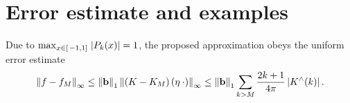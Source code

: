 \documentclass[11pt,a4paper,twoside,bibtotoc]{scrartcl}
\theoremstyle{plain}
\theoremstyle{definition}
\theoremstyle{remark}
\numberwithin{equation}{section}
\numberwithin{table}{section}
\numberwithin{figure}{section}
\begin{document}
\section{Error estimate and examples}
\label{Basics:SphericalKernels}
Due to $\max_{x \in \left[\left.-1,1\right]\right.} \left\vert P_{k}{\hspace{-0.4ex}}\left(x\right)\right\vert = 1$, the
proposed approximation obeys the uniform error estimate
\begin{equation}
  \label{error}
  \left\|f - f_{M}\right\|_{\infty} \le
  \left\|\mathbf{b}\right\|_1 \left\|\left(K-K_M\right){\hspace{-0.4ex}}\left(\mathbf{\eta} \: \cdot
  \right)\right\|_{\infty} \le \left\|\mathbf{b}\right\|_1 \sum_{k>M} \frac{2k+1}{4\pi}
  \left\vert K^{\wedge}{\hspace{-0.4ex}}\left(k\right)\right\vert.
\end{equation}

\end{document}
